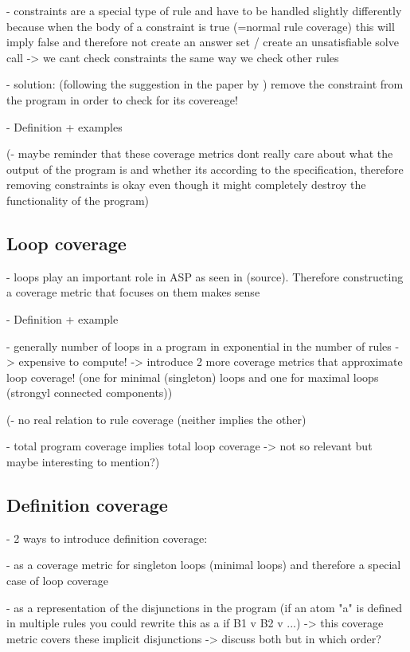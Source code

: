 - constraints are a special type of rule and have to be handled slightly differently because when the body of a constraint is true 
(=normal rule coverage) this will imply false and therefore not create an answer set / create an unsatisfiable solve call -> we 
cant check constraints the same way we check other rules

- solution: (following the suggestion in the paper by \textcite{Jan+11}) remove the constraint from the program in order to check 
for its covereage!

- Definition + examples

(- maybe reminder that these coverage metrics dont really care about what the output of the program is and whether its according to 
the specification, therefore removing constraints is okay even though it might completely destroy the functionality of the program)

\subsection{Loop coverage}
\label{subsec:Coverage metrics/Branch-like coverage/Loop coverage}
- loops play an important role in ASP as seen in (source). Therefore constructing a coverage metric that focuses on them makes sense

- Definition + example

- generally number of loops in a program in exponential in the number of rules -> expensive to compute! -> introduce 2 more 
coverage metrics that approximate loop coverage! (one for minimal (singleton) loops and one for maximal loops (strongyl connected 
components))

(- no real relation to rule coverage (neither implies the other)

- total program coverage implies total loop coverage -> not so relevant but maybe interesting to mention?)

\subsection{Definition coverage}
\label{subsec:Coverage metrics/Branch-like coverage/Definition coverage}
- 2 ways to introduce definition coverage: 
    
    - as a coverage metric for singleton loops (minimal loops) and therefore a special case of loop coverage

    - as a representation of the disjunctions in the program (if an atom "a" is defined in multiple rules you could rewrite 
    this as a if B1 v B2 v ...) -> this coverage metric covers these implicit disjunctions
-> discuss both but in which order?

